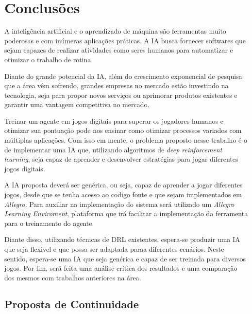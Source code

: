 \chapter{Conclusões}
\label{chap:conclusoes}

A inteligência artificial e o aprendizado de máquina são ferramentas muito poderosas e com inúmeras aplicações práticas. A IA busca fornecer softwares que sejam capazes de realizar atividades como seres humanos para automatizar e otimizar o trabalho de rotina. 

Diante do grande potencial da IA, além do crescimento exponencial de pesquisa que a área vêm sofrendo, grandes empresas no mercado estão investindo na tecnologia, seja para propor novos serviços ou aprimorar produtos existentes e garantir uma vantagem competitiva no mercado.


Treinar um agente em jogos digitais para superar os jogadores humanos e otimizar sua pontuação pode nos ensinar como otimizar processos variados com múltiplas aplicações. Com isso em mente, o problema proposto nesse trabalho é o de implementar uma IA que, utilizando algoritmos de \textit{deep reinforcement learning}, seja capaz de aprender e desenvolver estratégias para jogar diferentes jogos digitais. 

A IA proposta deverá ser genérica, ou seja, capaz de aprender a jogar diferentes jogos, desde que se tenha acesso ao codigo fonte e que sejam implementados em \textit{Allegro}. Para auxiliar na implementação do sistema será utilizado um \textit{Allegro Learning Enviroment}, plataforma que irá facilitar a implementação da ferramenta para o treinamento do agente. 

Diante disso, utilizando técnicas de DRL existentes, espera-se produzir uma IA que seja flexivel e que possa ser adaptada paraa diferentes cenários. Neste sentido, espera-se uma IA que seja genérica e capaz de ser treinada para diversos jogos. Por fim, será feita uma análise crítica dos resultados e uma comparação dos mesmos com trabalhos anteriores na área.
\clearpage
\section{Proposta de Continuidade} %
\label{sec:proposta_de_continuidade}

